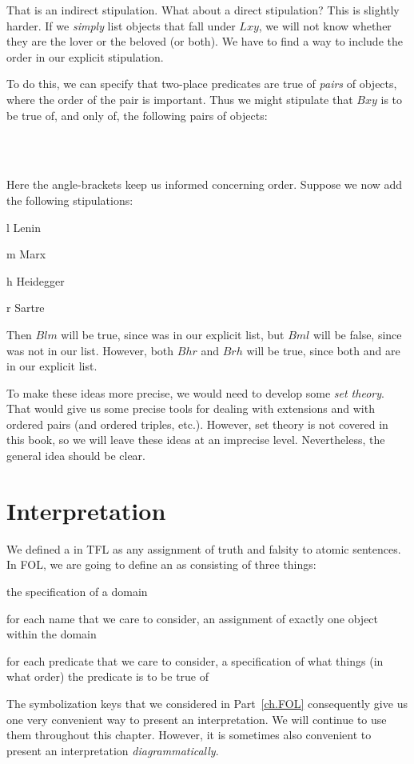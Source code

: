 That is an indirect stipulation. What about a direct stipulation? This is slightly harder. If we \emph{simply} list objects that fall under $Lxy$, we will not know whether they are the lover or the beloved (or both). We have to find a way to include the order in our explicit stipulation.

To do this, we can specify that two-place predicates are true of \emph{pairs} of objects, where the order of the pair is important. Thus we might stipulate that $Bxy$ is to be true of, and only of, the following pairs of objects:
	\begin{center}
		\\
		\\
	\end{center}
Here the angle-brackets keep us informed concerning order. Suppose we now add the following stipulations:
	\begin{ekey}
		\item[l] Lenin
		\item[m] Marx
		\item[h] Heidegger
		\item[r] Sartre
	\end{ekey}
Then $Blm$ will be true, since  was in our explicit list, but $Bml$ will be false, since  was not in our list. However, both $Bhr$ and $Brh$ will be true, since both  and  are in our explicit list.

To make these ideas more precise, we would need to develop some \emph{set theory}. That would give us some precise tools for dealing with extensions and with ordered pairs (and ordered triples, etc.). However, set theory is not covered in this book, so we will leave these ideas at an imprecise level. Nevertheless, the general idea should be clear.




\section{Interpretation}
We defined a  in TFL as any assignment of truth and falsity to atomic sentences. In FOL, we are going to define an  as consisting of three things:
	\begin{ebullet}
		\item the specification of a domain
		\item for each name that we care to consider, an assignment of exactly one object within the domain
		\item for each predicate that we care to consider, a specification of what things (in what order) the predicate is to be true of
	\end{ebullet}
The symbolization keys that we considered in Part~\ref{ch.FOL} consequently give us one very convenient way to present an interpretation. We will continue to use them throughout this chapter. However, it is sometimes also convenient to present an interpretation \emph{diagrammatically}.

